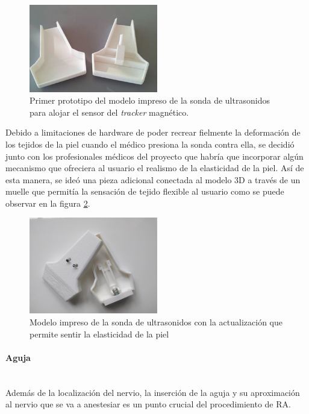 \begin{figure}[h]
    \centering
    \includegraphics[width=0.5\textwidth]{IMG/modelo3d.png}
    \caption{Primer prototipo del modelo impreso de la sonda de ultrasonidos para alojar el sensor del \emph{tracker} magnético.}
    \label{fig:m3d}
\end{figure}

Debido a limitaciones de hardware de poder recrear fielmente la deformación de los tejidos de la piel cuando el médico presiona la sonda contra ella, se decidió junto con los profesionales médicos del proyecto que habría que incorporar algún mecanismo que ofreciera al usuario el realismo de la elasticidad de la piel. Así de esta manera, se ideó una pieza adicional conectada al modelo 3D a través de un muelle que permitía la sensación de tejido flexible al usuario como se puede observar en la figura \ref{fig:m3dv2}.

\begin{figure}[h]
    \centering
    \includegraphics[width=0.5\textwidth]{IMG/modelo3dv2.jpg}
    \caption{Modelo impreso de la sonda de ultrasonidos con la actualización que permite sentir la elasticidad de la piel }
    \label{fig:m3dv2}
\end{figure}


\paragraph{Aguja}\mbox{}\\

Además de la localización del nervio, la inserción de la aguja y su aproximación al nervio que se va a anestesiar es un punto crucial del procedimiento de \ac{RA}. 

